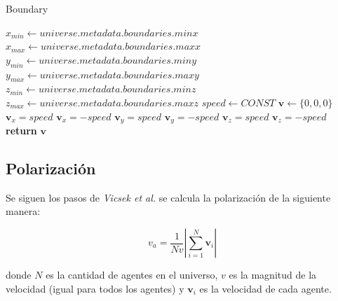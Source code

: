 \documentclass[a4paper]{article}
\begin{document}
                \begin{algorithm}
                    \caption{Boundary}\label{pseudo:boundary}
                    \begin{algorithmic}[1]
                        \State $x_{min} \gets universe.metadata.boundaries.minx$
                        \State $x_{max} \gets universe.metadata.boundaries.maxx$
                        \State $y_{min} \gets universe.metadata.boundaries.miny$
                        \State $y_{max} \gets universe.metadata.boundaries.maxy$
                        \State $z_{min} \gets universe.metadata.boundaries.minz$
                        \State $z_{max} \gets universe.metadata.boundaries.maxz$
                        \State $speed \gets CONST$
                        \State $\bm{v} \gets \{0, 0, 0\}$
                            \State $\bm{v}_x = speed$
                        \EndIf
                            \State $\bm{v}_x = -speed$
                        \EndIf
                            \State $\bm{v}_y = speed$
                        \EndIf
                            \State $\bm{v}_y = -speed$
                        \EndIf
                            \State $\bm{v}_z = speed$
                        \EndIf
                            \State $\bm{v}_z = -speed$
                        \EndIf
                        \State \textbf{return} $\bm{v}$
                    \EndProcedure
                    \end{algorithmic}
                \end{algorithm}

        \subsection{Polarización}
            Se siguen los pasos de \textit{Vicsek et al.} se calcula la polarización de la siguiente manera:

            \begin{equation} %
            v_a = \frac{1}{Nv}\left|\sum_{i=1}^{N}\mathbf{v}_i\right|
            \end{equation}

            donde $N$ es la cantidad de agentes en el universo, $v$ es la magnitud de la velocidad (igual para todos los agentes) y $\mathbf{v}_i$ es la velocidad de cada agente.
\end{document}
